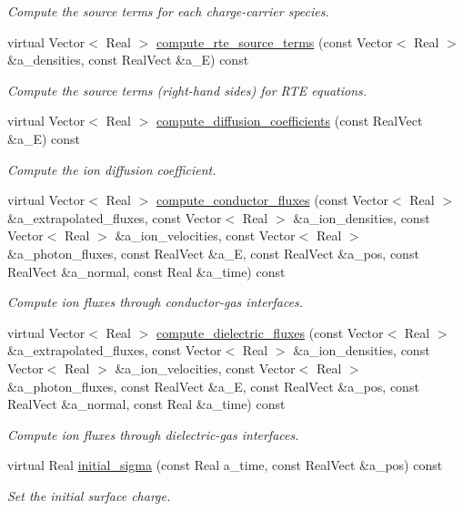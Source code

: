 \begin{DoxyCompactItemize}
\begin{DoxyCompactList}\small\item\em Compute the source terms for each charge-\/carrier species. \end{DoxyCompactList}\item 
virtual Vector$<$ Real $>$ \hyperlink{classair__bolsig_ac5feea7fa5367b9a53a7a0d16addee14}{compute\+\_\+rte\+\_\+source\+\_\+terms} (const Vector$<$ Real $>$ \&a\+\_\+densities, const Real\+Vect \&a\+\_\+E) const 
\begin{DoxyCompactList}\small\item\em Compute the source terms (right-\/hand sides) for R\+TE equations. \end{DoxyCompactList}\item 
virtual Vector$<$ Real $>$ \hyperlink{classair__bolsig_ab6b9d699ac0242d83b0c2a3f82a92804}{compute\+\_\+diffusion\+\_\+coefficients} (const Real\+Vect \&a\+\_\+E) const 
\begin{DoxyCompactList}\small\item\em Compute the ion diffusion coefficient. \end{DoxyCompactList}\item 
virtual Vector$<$ Real $>$ \hyperlink{classair__bolsig_ab46e52bbb868ab83ebbf4d0be888336f}{compute\+\_\+conductor\+\_\+fluxes} (const Vector$<$ Real $>$ \&a\+\_\+extrapolated\+\_\+fluxes, const Vector$<$ Real $>$ \&a\+\_\+ion\+\_\+densities, const Vector$<$ Real $>$ \&a\+\_\+ion\+\_\+velocities, const Vector$<$ Real $>$ \&a\+\_\+photon\+\_\+fluxes, const Real\+Vect \&a\+\_\+E, const Real\+Vect \&a\+\_\+pos, const Real\+Vect \&a\+\_\+normal, const Real \&a\+\_\+time) const 
\begin{DoxyCompactList}\small\item\em Compute ion fluxes through conductor-\/gas interfaces. \end{DoxyCompactList}\item 
virtual Vector$<$ Real $>$ \hyperlink{classair__bolsig_aa354d0095aff67df17bc87bdb8d9506e}{compute\+\_\+dielectric\+\_\+fluxes} (const Vector$<$ Real $>$ \&a\+\_\+extrapolated\+\_\+fluxes, const Vector$<$ Real $>$ \&a\+\_\+ion\+\_\+densities, const Vector$<$ Real $>$ \&a\+\_\+ion\+\_\+velocities, const Vector$<$ Real $>$ \&a\+\_\+photon\+\_\+fluxes, const Real\+Vect \&a\+\_\+E, const Real\+Vect \&a\+\_\+pos, const Real\+Vect \&a\+\_\+normal, const Real \&a\+\_\+time) const 
\begin{DoxyCompactList}\small\item\em Compute ion fluxes through dielectric-\/gas interfaces. \end{DoxyCompactList}\item 
virtual Real \hyperlink{classair__bolsig_a5612ffbdc5dae2e3137696cac1d81e17}{initial\+\_\+sigma} (const Real a\+\_\+time, const Real\+Vect \&a\+\_\+pos) const 
\begin{DoxyCompactList}\small\item\em Set the initial surface charge. \end{DoxyCompactList}\end{DoxyCompactItemize}
